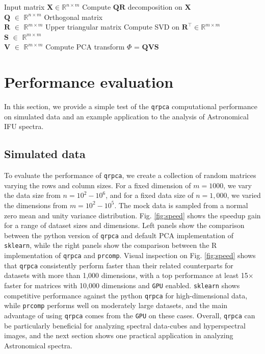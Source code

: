 \documentclass[preprint,authoryear,11pt,5p,times]{elsarticle}
\begin{document}
\begin{algorithm}[ht]
  \caption{QR-decomposition PCA}\label{alg:qrpca}
    \hspace*{\algorithmicindent} 
    \begin{algorithmic}[1]
        \Require Input matrix $\mathbf{X} \in \mathbb{R}^{n\times m}$
        \State Compute $\mathbf{QR}$ decomposition on $\mathbf{X}$\\
        $\mathbf{Q}$ $\in$ $\mathbb{R}^{n\times m}$ \quad Orthogonal matrix \\
        $\mathbf{R}$ $\in$ $\mathbb{R}^{m\times m}$ \quad Upper triangular matrix
    \State Compute SVD on $\mathbf{R}^{\intercal} \in \mathbb{R}^{m\times m}$\\
       $\mathbf{S}$ $\in$ $\mathbb{R}^{m\times m}$  \\
        $\mathbf{V}$ $\in$ $\mathbb{R}^{m\times m}$ 
    \State Compute PCA transform $\Phi$ = $\mathbf{Q}\mathbf{V}\mathbf{S}$ 
    \end{algorithmic}
\end{algorithm}


\section{Performance evaluation}
\label{sec:results}
In this section, we provide a simple test of the  \texttt{qrpca} computational performance on simulated data and an example application to the analysis of Astronomical IFU spectra.

\subsection{Simulated data}

To evaluate the performance of \texttt{qrpca}, we create a collection of random matrices varying the rows and column sizes. For a fixed dimension of $m = 1000$, we vary the data size from $n = 10^2 - 10^6$, and for a fixed data size of $n = 1,000$, we varied the dimensions from $m = 10^2 - 10^5$. The mock data is sampled from a normal zero mean and unity variance distribution. Fig. \ref{fig:speed} shows the speedup gain for a range of dataset sizes and dimensions. Left panels show the comparison between the python version of \texttt{qrpca} and default PCA implementation of  {\tt sklearn}, while the right panels show the comparison between the R implementation of \texttt{qrpca} and \texttt{prcomp}.  Visual inspection on Fig. \ref{fig:speed} shows that \texttt{qrpca} consistently perform faster than their related counterparts for datasets with more than 1,000 dimensions, with a top performance at least 15$\times$ faster for matrices with 10,000 dimensions and {\tt GPU} enabled. \texttt{sklearn} shows competitive performance against the python \texttt{qrpca} for high-dimensional data, while \texttt{prcomp} performs well on moderately large datasets, and the main advantage of using  \texttt{qrpca} comes from the {\tt GPU} on these cases. 
Overall, \texttt{qrpca} can be particularly beneficial for analyzing spectral data-cubes and hyperspectral images, and the next section shows one practical application in analyzing Astronomical spectra. 
\end{document}
